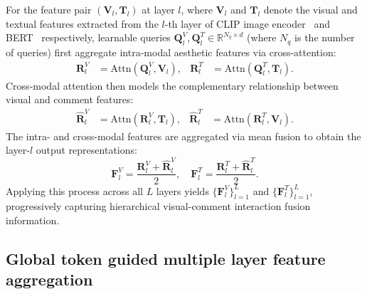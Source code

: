 \documentclass[journal]{IEEEtran}
\begin{document}
For the feature pair $(\mathbf{V}_l,\mathbf{T}_l)$ at layer $l$, where $\mathbf{V}_l$ and $\mathbf{T}_l$ denote the visual and textual features extracted from the $l$-th layer of CLIP image encoder~\cite{radford2021clip} and BERT~\cite{devlin2019bert} respectively, learnable queries $\mathbf{Q}_l^V,\mathbf{Q}_l^T\in\mathbb{R}^{N_q\times d}$ (where $N_q$ is the number of queries) first aggregate intra-modal aesthetic features via cross-attention:
\begin{equation}
\begin{aligned}
{\mathbf{R}}_l^V&=\mathrm{Attn}(\mathbf{Q}_l^V,\mathbf{V}_l),&
{\mathbf{R}}_l^T&=\mathrm{Attn}(\mathbf{Q}_l^T,\mathbf{T}_l).
\end{aligned}
\end{equation}
Cross-modal attention then models the complementary relationship between visual and comment features:
\begin{equation}
\begin{aligned}
\hat{\mathbf{R}}_l^V&=\mathrm{Attn}(\mathbf{R}_l^V,\mathbf{T}_l),&
\hat{\mathbf{R}}_l^T&=\mathrm{Attn}(\mathbf{R}_l^T,\mathbf{V}_l).
\end{aligned}
\end{equation}
The intra- and cross-modal features are aggregated via mean fusion to obtain the layer-$l$ output representations:
\begin{equation}
\mathbf{F}_l^V=\frac{{\mathbf{R}}_l^V+\hat{\mathbf{R}}_l^V}{2},\quad
\mathbf{F}_l^T=\frac{{\mathbf{R}}_l^T+\hat{\mathbf{R}}_l^T}{2}.
\end{equation}
Applying this process across all $L$ layers yields $\{\mathbf{F}_l^V\}_{l=1}^{L}$ and $\{\mathbf{F}_l^T\}_{l=1}^{L}$, progressively capturing hierarchical visual-comment interaction fusion information.

\subsection{ Global token guided multiple layer feature aggregation}
\end{document}
